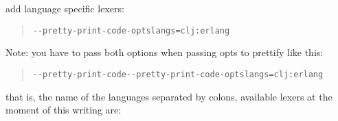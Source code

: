 \documentclass[a4paper]{article}
\begin{document}
add language specific lexers:

\begin{quote}
\begin{alltt}
-{}-pretty-print-code-opts langs=clj:erlang
\end{alltt}
\end{quote}

Note: you have to pass both options when passing opts to prettify like this:

\begin{quote}
\begin{alltt}
-{}-pretty-print-code -{}-pretty-print-code-opts langs=clj:erlang
\end{alltt}
\end{quote}

that is, the name of the languages separated by colons, available lexers at the
moment of this writing are:
\end{document}
